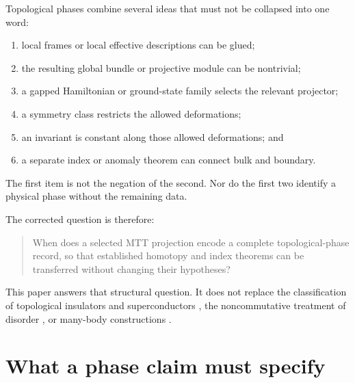 \documentclass[11pt]{article}
\theoremstyle{definition}
\theoremstyle{remark}
\begin{document}
Topological phases combine several ideas that must not be collapsed into one
word:
\begin{enumerate}[label=(Q\arabic*)]
\item local frames or local effective descriptions can be glued;
\item the resulting global bundle or projective module can be nontrivial;
\item a gapped Hamiltonian or ground-state family selects the relevant
  projector;
\item a symmetry class restricts the allowed deformations;
\item an invariant is constant along those allowed deformations; and
\item a separate index or anomaly theorem can connect bulk and boundary.
\end{enumerate}
The first item is not the negation of the second.  Nor do the first two
identify a physical phase without the remaining data.

The corrected question is therefore:
\begin{quote}
When does a selected MTT projection encode a complete topological-phase
record, so that established homotopy and index theorems can be transferred
without changing their hypotheses?
\end{quote}
This paper answers that structural question.  It does not replace the
classification of topological insulators and superconductors
\cite{Schnyder2008,Kitaev2009,Ryu2010}, the noncommutative treatment of
disorder \cite{Bellissard1994}, or many-body constructions
\cite{Niu1985,Hastings2015}.

\section{What a phase claim must specify}
\label{sec:record}
\end{document}
